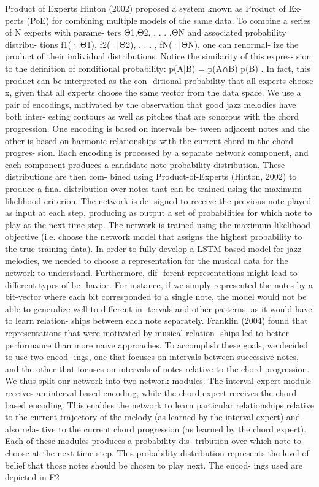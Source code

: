 \cite{Johnson2017} Product of Experts
Hinton (2002) proposed a system known as Product of Ex- perts (PoE) for combining multiple models of the same data. To combine a series of N experts with parame- ters Θ1,Θ2, . . . ,ΘN and associated probability distribu-
tions f1(·|Θ1), f2(·|Θ2), . . . , fN(·|ΘN), one can renormal- ize the product of their individual distributions.
Notice the similarity of this expres- sion to the definition of conditional probability: p(A|B) = p(A∩B) p(B) . In fact, this product can be interpreted as the con-
ditional probability that all experts choose x, given that all experts choose the same vector from the data space.
We use a pair of encodings, motivated
by the observation that good jazz melodies have both inter- esting contours as well as pitches that are sonorous with the chord progression. One encoding is based on intervals be- tween adjacent notes and the other is based on harmonic relationships with the current chord in the chord progres- sion. Each encoding is processed by a separate network component, and each component produces a candidate note probability distribution. These distributions are then com- bined using Product-of-Experts (Hinton, 2002) to produce a final distribution over notes that can be trained using the maximum-likelihood criterion.
The network is de- signed to receive the previous note played as input at each step, producing as output a set of probabilities for which note to play at the next time step. The network is trained using the maximum-likelihood objective (i.e. choose the network model that assigns the highest probability to the true training data).
In order to fully develop a LSTM-based model for jazz melodies, we needed to choose a representation for the musical data for the network to understand. Furthermore, dif- ferent representations might lead to different types of be- havior. For instance, if we simply represented the notes by a bit-vector where each bit corresponded to a single note, the model would not be able to generalize well to different in- tervals and other patterns, as it would have to learn relation- ships between each note separately. Franklin (2004) found that representations that were motivated by musical relation- ships led to better performance than more naive approaches.
To accomplish these goals, we decided to use two encod-
ings, one that focuses on intervals between successive notes, and the other that focuses on intervals of notes relative to the chord progression. We thus split our network into two network modules. The interval expert module receives an interval-based encoding, while the chord expert receives the chord-based encoding. This enables the network to learn particular relationships relative to the current trajectory of the melody (as learned by the interval expert) and also rela- tive to the current chord progression (as learned by the chord expert). Each of these modules produces a probability dis- tribution over which note to choose at the next time step. This probability distribution represents the level of belief that those notes should be chosen to play next. The encod- ings used are depicted in F2

